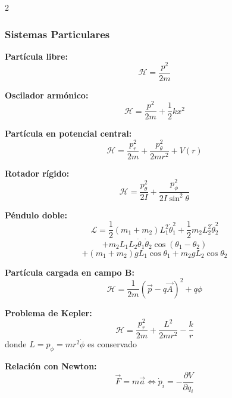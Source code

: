 \documentclass{article}
\begin{document}
\begin{multicols}{2}
\subsubsection*{Sistemas Particulares}

\begin{itemform}
\item \textbf{Partícula libre:}
$$\mathcal{H} = \frac{p^2}{2m}$$

\item \textbf{Oscilador armónico:}
$$\mathcal{H} = \frac{p^2}{2m} + \frac{1}{2}kx^2$$

\item \textbf{Partícula en potencial central:}
$$\mathcal{H} = \frac{p_r^2}{2m} + \frac{p_\theta^2}{2mr^2} + V(r)$$

\item \textbf{Rotador rígido:}
$$\mathcal{H} = \frac{p_\theta^2}{2I} + \frac{p_\phi^2}{2I\sin^2\theta}$$
\end{itemform}



\begin{itemform}
\item \textbf{Péndulo doble:}
$$\mathcal{L} = \frac{1}{2}(m_1+m_2)L_1^2\dot{\theta}_1^2 + \frac{1}{2}m_2L_2^2\dot{\theta}_2^2$$
$$+ m_2L_1L_2\dot{\theta}_1\dot{\theta}_2\cos(\theta_1-\theta_2)$$
$$+ (m_1+m_2)gL_1\cos\theta_1 + m_2gL_2\cos\theta_2$$

\item \textbf{Partícula cargada en campo B:}
$$\mathcal{H} = \frac{1}{2m}(\vec{p}-q\vec{A})^2 + q\phi$$

\item \textbf{Problema de Kepler:}
$$\mathcal{H} = \frac{p_r^2}{2m} + \frac{L^2}{2mr^2} - \frac{k}{r}$$
donde $L = p_\phi = mr^2\dot{\phi}$ es conservado

\item \textbf{Relación con Newton:}
$$\vec{F} = m\vec{a} \Leftrightarrow \dot{p}_i = -\frac{\partial V}{\partial q_i}$$
\end{itemform}

\end{multicols}

\newpage
\end{document}
